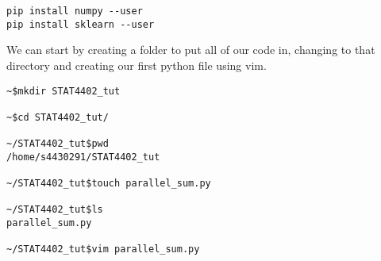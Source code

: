 \begin{verbatim}
pip install numpy --user
pip install sklearn --user
\end{verbatim}

We can start by creating a folder to put all of our code in, changing to that directory and creating our first python file using vim.

\begin{verbatim}
~$mkdir STAT4402_tut

~$cd STAT4402_tut/

~/STAT4402_tut$pwd
/home/s4430291/STAT4402_tut

~/STAT4402_tut$touch parallel_sum.py

~/STAT4402_tut$ls
parallel_sum.py

~/STAT4402_tut$vim parallel_sum.py
\end{verbatim}

